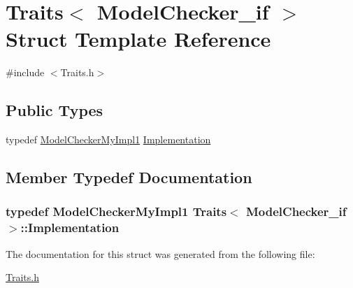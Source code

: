 \hypertarget{struct_traits_3_01_model_checker__if_01_4}{\section{Traits$<$ Model\-Checker\-\_\-if $>$ Struct Template Reference}
\label{struct_traits_3_01_model_checker__if_01_4}
}


{\ttfamily \#include $<$Traits.\-h$>$}

\subsection*{Public Types}
\begin{DoxyCompactItemize}
\item 
typedef \hyperlink{class_model_checker_my_impl1}{Model\-Checker\-My\-Impl1} \hyperlink{struct_traits_3_01_model_checker__if_01_4_aa969b0d5a3092d9a06c83185140de59b}{Implementation}
\end{DoxyCompactItemize}


\subsection{Member Typedef Documentation}
\hypertarget{struct_traits_3_01_model_checker__if_01_4_aa969b0d5a3092d9a06c83185140de59b}{
\subsubsection[{Implementation}]{\setlength{\rightskip}{0pt plus 5cm}typedef {\bf Model\-Checker\-My\-Impl1} {\bf Traits}$<$ {\bf Model\-Checker\-\_\-if} $>$\-::{\bf Implementation}}}\label{struct_traits_3_01_model_checker__if_01_4_aa969b0d5a3092d9a06c83185140de59b}


The documentation for this struct was generated from the following file\-:\begin{DoxyCompactItemize}
\item 
\hyperlink{_traits_8h}{Traits.\-h}\end{DoxyCompactItemize}
